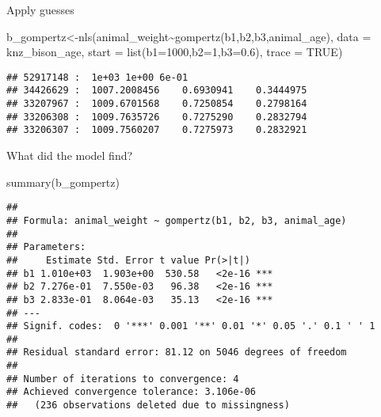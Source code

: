 \documentclass[
  ignorenonframetext,
]{beamer}
\newenvironment{Shaded}{\begin{snugshade}}{\end{snugshade}}
\newcommand{\AttributeTok}[1]{\textcolor[rgb]{0.77,0.63,0.00}{#1}}
\newcommand{\ConstantTok}[1]{\textcolor[rgb]{0.00,0.00,0.00}{#1}}
\newcommand{\DecValTok}[1]{\textcolor[rgb]{0.00,0.00,0.81}{#1}}
\newcommand{\FloatTok}[1]{\textcolor[rgb]{0.00,0.00,0.81}{#1}}
\newcommand{\FunctionTok}[1]{\textcolor[rgb]{0.00,0.00,0.00}{#1}}
\newcommand{\NormalTok}[1]{#1}
\newcommand{\OtherTok}[1]{\textcolor[rgb]{0.56,0.35,0.01}{#1}}
\newcommand{\SpecialCharTok}[1]{\textcolor[rgb]{0.00,0.00,0.00}{#1}}
\begin{document}
\begin{frame}[fragile]{Apply guesses}
\protect\hypertarget{apply-guesses}{}
\small

\begin{Shaded}
\begin{Highlighting}[]
\NormalTok{b\_gompertz}\OtherTok{\textless{}{-}}\FunctionTok{nls}\NormalTok{(animal\_weight}\SpecialCharTok{\textasciitilde{}}\FunctionTok{gompertz}\NormalTok{(b1,b2,b3,animal\_age),}
                      \AttributeTok{data =}\NormalTok{ knz\_bison\_age,}
                      \AttributeTok{start =} \FunctionTok{list}\NormalTok{(}\AttributeTok{b1=}\DecValTok{1000}\NormalTok{,}\AttributeTok{b2=}\DecValTok{1}\NormalTok{,}\AttributeTok{b3=}\FloatTok{0.6}\NormalTok{),}
                      \AttributeTok{trace =} \ConstantTok{TRUE}\NormalTok{)}
\end{Highlighting}
\end{Shaded}

\begin{verbatim}
## 52917148 :  1e+03 1e+00 6e-01
## 34426629 :  1007.2008456    0.6930941    0.3444975
## 33207967 :  1009.6701568    0.7250854    0.2798164
## 33206308 :  1009.7635726    0.7275290    0.2832794
## 33206307 :  1009.7560207    0.7275973    0.2832921
\end{verbatim}
\end{frame}

\begin{frame}[fragile]{What did the model find?}
\protect\hypertarget{what-did-the-model-find}{}
\footnotesize

\begin{Shaded}
\begin{Highlighting}[]
\FunctionTok{summary}\NormalTok{(b\_gompertz)}
\end{Highlighting}
\end{Shaded}

\begin{verbatim}
## 
## Formula: animal_weight ~ gompertz(b1, b2, b3, animal_age)
## 
## Parameters:
##     Estimate Std. Error t value Pr(>|t|)    
## b1 1.010e+03  1.903e+00  530.58   <2e-16 ***
## b2 7.276e-01  7.550e-03   96.38   <2e-16 ***
## b3 2.833e-01  8.064e-03   35.13   <2e-16 ***
## ---
## Signif. codes:  0 '***' 0.001 '**' 0.01 '*' 0.05 '.' 0.1 ' ' 1
## 
## Residual standard error: 81.12 on 5046 degrees of freedom
## 
## Number of iterations to convergence: 4 
## Achieved convergence tolerance: 3.106e-06
##   (236 observations deleted due to missingness)
\end{verbatim}
\end{frame}
\end{document}
